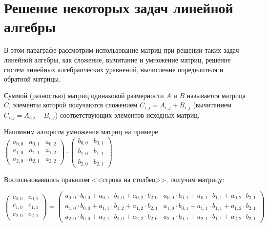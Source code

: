 \section[Решение некоторых задач линейной алгебры]{Решение некоторых задач линейной алгебры}\label{ch06:4}
В этом параграфе рассмотрим использование матриц при решении таких задач линейной алгебры, как сложение, вычитание и
умножение матриц, решение систем линейных алгебраических уравнений, вычисление определителя и обратной матрицы. 


Суммой (разностью) матриц одинаковой размерности $A$ и $B$ называется матрица $C$, элементы которой получаются сложением 
$C_{i,j}=A_{i,j}+B_{i,j}$ (вычитанием  $C_{i,j}=A_{i,j}-B_{i,j}$) соответствующих элементов исходных матриц. 

Напомним алгоритм умножения матриц на примере\\ 
{\small $\left(\begin{matrix}a_{0,0}&a_{0,1}&a_{0,2}\\a_{1,0}&a_{1,1}&a_{1,2}\\a_{2,0}&a_{2,1}&a_{2,2}\end{matrix}\right)\cdot
\left(\begin{matrix}b_{0,0}&b_{0,1}\\b_{1,0}&b_{1,1}\\b_{2,0}&b_{2,1}\end{matrix}\right)$ 
}

Воспользовавшись правилом <<строка на столбец>>, получим матрицу: 

{\noindent\small
$\left(\begin{matrix}c_{0,0}&c_{0,1}\\c_{1,0}&c_{1,1}\\c_{2,0}&c_{2,1}\end{matrix}\right)=
\left(\begin{matrix}a_{0,0}\cdot
b_{0,0}+a_{0,1}\cdot b_{1,0}+a_{0,2}\cdot b_{2,0}&a_{0,0}\cdot b_{0,1}+a_{0,1}\cdot b_{1,1}+a_{0,2}\cdot
b_{2,1}\\a_{1,0}\cdot b_{0,0}+a_{1,1}\cdot b_{1,2}+a_{1,2}\cdot b_{2,1}&a_{1,0}\cdot b_{0,1}+a_{1,1}\cdot
b_{1,1}+a_{1,2}\cdot b_{2,1}\\a_{2,0}\cdot b_{0,0}+a_{2,1}\cdot b_{1,0}+a_{2,2}\cdot b_{2,0}&a_{2,0}\cdot
b_{0,1}+a_{2,1}\cdot b_{1,1}+a_{2,2}\cdot b_{2,1}\end{matrix}\right)$
}

